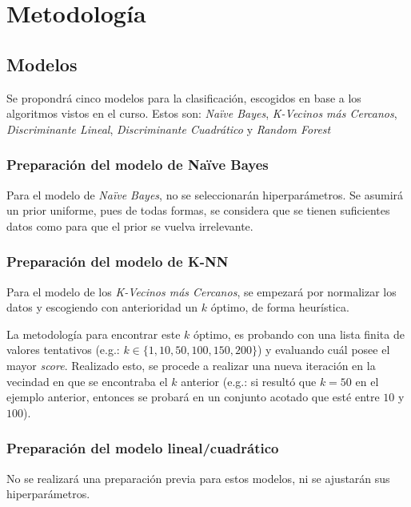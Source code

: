 \section{Metodología}


\subsection{Modelos}
Se propondrá cinco modelos para la clasificación, escogidos en base a los algoritmos vistos en el curso. Estos son: \textit{Naïve Bayes}, \textit{K-Vecinos más Cercanos}, \textit{Discriminante Lineal}, \textit{Discriminante Cuadrático} y \textit{Random Forest}

\subsubsection{Preparación del modelo de Naïve Bayes}
Para el modelo de \textit{Naïve Bayes}, no se seleccionarán hiperparámetros. Se asumirá un prior uniforme, pues de todas formas, se considera que se tienen suficientes datos como para que el prior se vuelva irrelevante. 

\subsubsection{Preparación del modelo de K-NN}
Para el modelo de los \textit{K-Vecinos más Cercanos}, se empezará por normalizar los datos y escogiendo con anterioridad un $k$ óptimo, de forma heurística. 

La metodología para encontrar este $k$ óptimo, es probando con una lista finita de valores tentativos (e.g.: $k\in\{1, 10, 50, 100, 150, 200\}$) y evaluando cuál posee el mayor \textit{score}. Realizado esto, se procede a realizar una nueva iteración en la vecindad en que se encontraba el $k$ anterior (e.g.: si resultó que $k=50$ en el ejemplo anterior, entonces se probará en un conjunto acotado que esté entre $10$ y $100$).

\subsubsection{Preparación del modelo lineal/cuadrático}
No se realizará una preparación previa para estos modelos, ni se ajustarán sus hiperparámetros.

